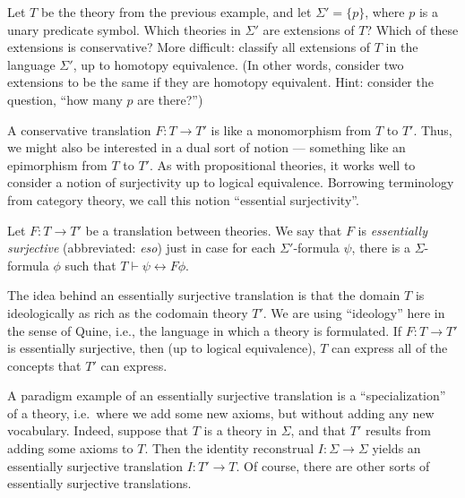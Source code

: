 \begin{exercise} Let $T$ be the theory from the previous example, and
  let $\Sigma '=\{ p\}$, where $p$ is a unary predicate symbol.  Which
  theories in $\Sigma '$ are extensions of $T$?  Which of these
  extensions is conservative?  More difficult: classify all extensions
  of $T$ in the language $\Sigma '$, up to homotopy equivalence.  (In
  other words, consider two extensions to be the same if they are
  homotopy equivalent.  Hint: consider the question, ``how many $p$
  are there?'')
\end{exercise}


A conservative translation $F:T\to T'$ is like a monomorphism from $T$
to $T'$.  Thus, we might also be interested in a dual sort of notion
--- something like an epimorphism from $T$ to $T'$.  As with
propositional theories, it works well to consider a notion of
surjectivity up to logical equivalence.  Borrowing terminology from
category theory, we call this notion ``essential surjectivity''.

\begin{defn} Let $F:T\to T'$ be a translation between theories.  We
  say that $F$ is \emph{essentially surjective} (abbreviated:
  \emph{eso}) just in case for each $\Sigma '$-formula $\psi$, there
  is a $\Sigma$-formula $\phi$ such that
  $T\vdash \psi\leftrightarrow F\phi$. \end{defn}

The idea behind an essentially surjective translation is that the
domain $T$ is ideologically as rich as the codomain theory $T'$.  We
are using ``ideology'' here in the sense of Quine, i.e., the language
in which a theory is formulated.  If $F:T\to T'$ is essentially
surjective, then (up to logical equivalence), $T$ can express all of
the concepts that $T'$ can express.

A paradigm example of an essentially surjective translation is a
``specialization'' of a theory, i.e.\ where we add some new axioms,
but without adding any new vocabulary.  Indeed, suppose that $T$ is a
theory in $\Sigma$, and that $T'$ results from adding some axioms to
$T$.  Then the identity reconstrual $I:\Sigma\to\Sigma$ yields an
essentially surjective translation $I:T'\to T$.  Of course, there are
other sorts of essentially surjective translations.


